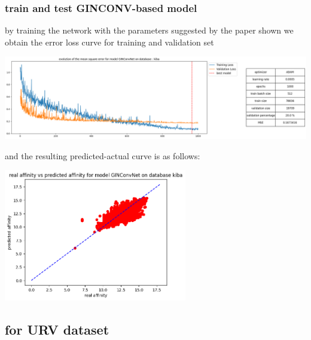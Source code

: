 \documentclass[11pt, a4paper]{article}
\begin{document}
        \subsubsection{train and test GINCONV-based model}
        by training the network with the parameters suggested by the paper shown we obtain the error loss curve for training and validation set 
        \begin{center}
            \includegraphics[width=1.0\textwidth]{train_test_plots/kiba GINCONV train.png}
        \end{center}
        and the resulting predicted-actual curve is as follows:
        \begin{center}
            \includegraphics[width=0.6\textwidth]{train_test_plots/kiba GINCONV test.png}
        \end{center}
    
    \subsection{for URV dataset}
\end{document}

